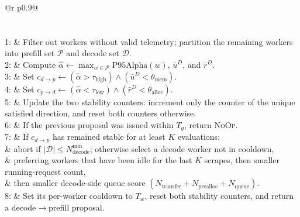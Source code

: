 \begin{algorithm}[t]
\small
\caption{\cluster: Alpha-Led Role Switching with Stability and Cooldown Guards}
\label{alg:cluster}
\begin{tabular}{@{}r p{0.9\linewidth}@{}}
 \\
 \\
 \\
1: & Filter out workers without valid telemetry; partition the remaining workers into prefill set $\mathcal{P}$ and decode set $\mathcal{D}$. \\
2: & Compute $\hat{\alpha} \leftarrow \max_{w\in\mathcal{P}}\mathrm{P95Alpha}(w)$, $\bar{u}^{D}$, and $\bar{r}^{D}$. \\
3: & Set $c_{d\rightarrow p} \leftarrow (\hat{\alpha}>\tau_{\mathrm{high}})\land(\bar{u}^{D}<\theta_{\mathrm{mem}})$. \\
4: & Set $c_{p\rightarrow d} \leftarrow (\hat{\alpha}<\tau_{\mathrm{low}})\land(\bar{r}^{D}<\theta_{\mathrm{alloc}})$. \\
5: & Update the two stability counters: increment only the counter of the unique satisfied direction, and reset both counters otherwise. \\
6: & If the previous proposal was issued within $T_g$, return \textsc{NoOp}. \\
7: & If $c_{d\rightarrow p}$ has remained stable for at least $K$ evaluations: \\
   & \hspace*{1.8em}abort if $|\mathcal{D}| \le N_{\mathrm{decode}}^{\min}$; otherwise select a decode worker not in cooldown, \\
   & \hspace*{1.8em}preferring workers that have been idle for the last $K$ scrapes, then smaller running-request count, \\
   & \hspace*{1.8em}then smaller decode-side queue score $(N_{\mathrm{transfer}} + N_{\mathrm{prealloc}} + N_{\mathrm{queue}})$. \\
8: & \hspace*{1.8em}Set its per-worker cooldown to $T_w$, reset both stability counters, and return a decode$\rightarrow$prefill proposal. \\

\end{tabular}
\end{algorithm}
